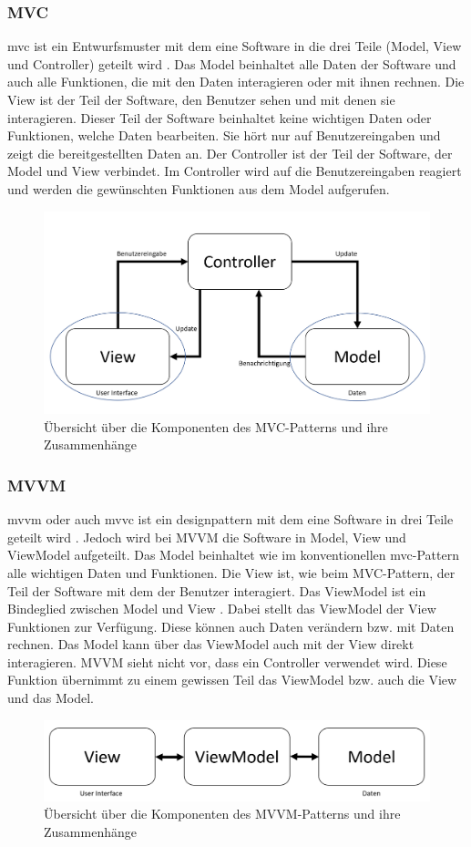 \subsubsection{MVC}
\Gls{mvc} ist ein Entwurfsmuster mit dem eine Software in die drei Teile (Model, View und Controller) geteilt wird \cite{mvc}. Das Model beinhaltet alle Daten der Software und auch alle Funktionen, die mit den Daten interagieren oder mit ihnen rechnen. Die View ist der Teil der Software, den Benutzer sehen und mit denen sie interagieren. Dieser Teil der Software beinhaltet keine wichtigen Daten oder Funktionen, welche Daten bearbeiten. Sie hört nur auf Benutzereingaben und zeigt die bereitgestellten Daten an. Der Controller ist der Teil der Software, der Model und View verbindet. Im Controller wird auf die Benutzereingaben reagiert und werden die gewünschten Funktionen aus dem Model aufgerufen.
\begin{figure}[H]
	\centering
	\includegraphics[width=0.8\linewidth]{images/mvc}
	\caption[Übersicht des MVC-Patterns]{Übersicht über die Komponenten des MVC-Patterns und ihre Zusammenhänge}
	\label{fig:mvc}
\end{figure}
\subsubsection{MVVM}
\Gls{mvvm} oder auch \Gls{mvvc} ist ein \Gls{designpattern} mit dem eine Software in drei Teile geteilt wird \cite{mvvm_vue}. Jedoch wird bei MVVM die Software in Model, View und ViewModel aufgeteilt. 
Das Model beinhaltet wie im konventionellen \Gls{mvc}-Pattern alle wichtigen Daten und Funktionen. 
Die View ist, wie beim MVC-Pattern, der Teil der Software mit dem der Benutzer interagiert. 
Das ViewModel ist ein Bindeglied zwischen Model und View \cite{mvvm_vue}. Dabei stellt das ViewModel der View Funktionen zur Verfügung. Diese können auch Daten verändern bzw. mit Daten rechnen. Das Model kann über das ViewModel auch mit der View direkt interagieren. 
MVVM sieht nicht vor, dass ein Controller verwendet wird. Diese Funktion übernimmt zu einem gewissen Teil das ViewModel bzw. auch die View und das Model.
\begin{figure}[H]
	\centering
	\includegraphics[width=0.8\linewidth]{images/mvvm}
	\caption[Übersicht des MVVM-Patterns]{Übersicht über die Komponenten des MVVM-Patterns und ihre Zusammenhänge}
	\label{fig:mvvm}
\end{figure}
